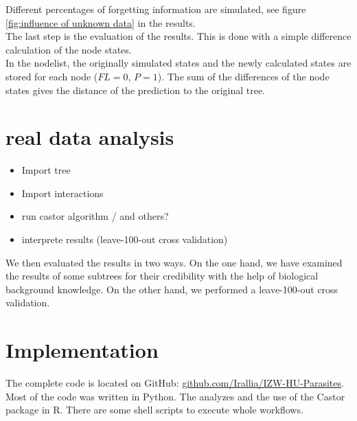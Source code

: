     Different percentages of forgetting information are simulated, see figure 
      \ref{fig:influence of unknown data} in the results. \\
  
    The last step is the evaluation of the results. This is done with a simple difference calculation 
      of the node states. \\
    In the nodelist, the originally simulated states and the newly calculated states are stored for 
      each node ($FL = 0$, $P = 1$). The sum of the differences of the node states gives the distance 
      of the prediction to the original tree.

  \section{real data analysis}
    \begin{itemize}
      \item Import tree
      \item Import interactions
      \item run castor algorithm / and others?
      \item interprete results (leave-100-out cross validation)
    \end{itemize}
    We then evaluated the results in two ways. On the one hand, we have examined the results of some 
      subtrees for their credibility with the help of biological background knowledge. On the other 
      hand, we performed a leave-100-out cross validation.

  \section{Implementation}
    The complete code is located on GitHub: 
      \hyperlink{github.com/Irallia/IZW-HU-Parasites}{github.com/Irallia/IZW-HU-Parasites}. \\
    Most of the code was written in Python. The analyzes and the use of the Castor package in R. There 
      are some shell scripts to execute whole workflows.

